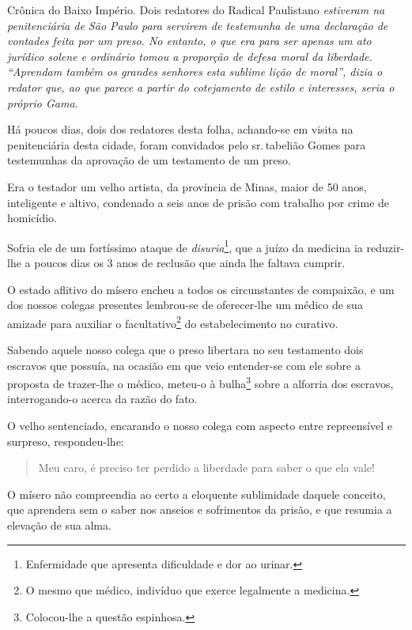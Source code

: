 \begin{didascalia}
Crônica do Baixo Império. Dois redatores do Radical Paulistano
\emph{estiveram na penitenciária de São Paulo para servirem de
testemunha de uma declaração de vontades feita por um preso. No entanto,
o que era para ser apenas um ato jurídico solene e ordinário tomou a
proporção de defesa moral da liberdade. ``Aprendam também os grandes
senhores esta sublime lição de moral'', dizia o redator que, ao que
parece a partir do cotejamento de estilo e interesses, seria o próprio
Gama.}
\end{didascalia}



Há poucos dias, dois dos redatores desta folha, achando-se em visita na
penitenciária desta cidade, foram convidados pelo sr.\,tabelião Gomes
para testemunhas da aprovação de um testamento de um preso.

Era o testador um velho artista, da província de Minas, maior de 50
anos, inteligente e altivo, condenado a seis anos de prisão com trabalho
por crime de homicídio.

Sofria ele de um fortíssimo ataque de \emph{disuria}\footnote{
  Enfermidade que apresenta dificuldade e dor ao urinar.}, que a juízo
da medicina ia reduzir-lhe a poucos dias os 3 anos de reclusão que ainda
lhe faltava cumprir.

O estado aflitivo do mísero encheu a todos os circunstantes de
compaixão, e um dos nossos colegas presentes lembrou-se de oferecer-lhe
um médico de sua amizade para auxiliar o facultativo\footnote{O mesmo
  que médico, indivíduo que exerce legalmente a medicina.} do
estabelecimento no curativo.

Sabendo aquele nosso colega que o preso libertara no seu testamento dois
escravos que possuía, na ocasião em que veio entender-se com ele sobre a
proposta de trazer-lhe o médico, meteu-o à bulha\footnote{Colocou-lhe
  a questão espinhosa.} sobre a alforria dos escravos, interrogando-o
acerca da razão do fato.

O velho sentenciado, encarando o nosso colega com aspecto entre
repreensível e surpreso, respondeu-lhe:

\begin{quote}
Meu caro, é preciso ter perdido a liberdade para saber o que ela vale!
\end{quote}

O mísero não compreendia ao certo a eloquente sublimidade daquele
conceito, que aprendera sem o saber nos anseios e sofrimentos da prisão,
e que resumia a elevação de sua alma.

